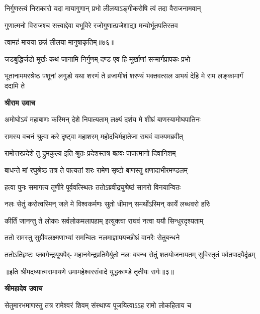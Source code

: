 \twolineshloka
{निर्गुणस्त्वं निराकारो यदा मायागुणान् प्रभो}
{लीलयाऽङ्गीकरोषि त्वं तदा वैराजनामवान्} %

\twolineshloka
{गुणात्मनो विराजश्च सत्त्वाद्देवा बभूविरे}
{रजोगुणात्प्रजेशाद्या मन्योर्भूतपतिस्तव} %

{त्वामहं मायया छन्नं लीलया मानुषाकृतिम्॥७६॥} %


\twolineshloka
{जडबुद्धिर्जडो मूर्खः कथं जानामि निर्गुणम्}
{दण्ड एव हि मूर्खाणां सन्मार्गप्रापकः प्रभो} %

\threelineshloka
{भूतानाममरश्रेष्ठ पशूनां लगुडो यथा}
{शरणं ते व्रजामीशं शरण्यं भक्तवत्सल}
{अभयं देहि मे राम लङ्कामार्गं ददामि ते} %

\textbf{श्रीराम उवाच}

\twolineshloka
{अमोघोऽयं महाबाणः कस्मिन् देशे निपात्यताम्}
{लक्ष्यं दर्शय मे शीघ्रं बाणस्यामोघपातिनः} %

\twolineshloka
{रामस्य वचनं श्रुत्वा करे दृष्ट्वा महाशरम्}
{महोदधिर्महातेजा राघवं वाक्यमब्रवीत्} %

\twolineshloka
{रामोत्तरप्रदेशे तु द्रुमकुल्य इति श्रुतः}
{प्रदेशस्तत्र बहवः पापात्मानो दिवानिशम्} %

\twolineshloka
{बाधन्ते मां रघुश्रेष्ठ तत्र ते पात्यतां शरः}
{रामेण सृष्टो बाणस्तु क्षणादाभीरमण्डलम्} %

\twolineshloka
{हत्वा पुनः समागत्य तूणीरे पूर्ववत्स्थितः}
{ततोऽब्रवीद्रघुश्रेष्ठं सागरो विनयान्वितः} %

\twolineshloka
{नलः सेतुं करोत्वस्मिन् जले मे विश्वकर्मणः}
{सुतो धीमान् समर्थोऽस्मिन् कार्ये लब्धवरो हरिः} %

\twolineshloka
{कीर्तिं जानन्तु ते लोकाः सर्वलोकमलापहाम्}
{इत्युक्त्वा राघवं नत्वा ययौ सिन्धुरदृश्यताम्} %

\twolineshloka
{ततो रामस्तु सुग्रीवलक्ष्मणाभ्यां समन्वितः}
{नलमाज्ञापयच्छीघ्रं वानरैः सेतुबन्धने} %

\fourlineindentedshloka
{ततोऽतिहृष्टः प्लवगेन्द्रयूथपैर्-}
{महानगेन्द्रप्रतिमैर्युतो नलः}
{बबन्ध सेतुं शतयोजनायतम्}
{सुविस्तृतं पर्वतपादपैर्दृढम्} %

{॥इति श्रीमदध्यात्मरामायणे उमामहेश्वरसंवादे युद्धकाण्डे
तृतीयः सर्गः॥३॥
}




\textbf{श्रीमहादेव उवाच}

\twolineshloka
{सेतुमारभमाणस्तु तत्र रामेश्वरं शिवम्}
{संस्थाप्य पूजयित्वाऽऽह रामो लोकहिताय च} %


